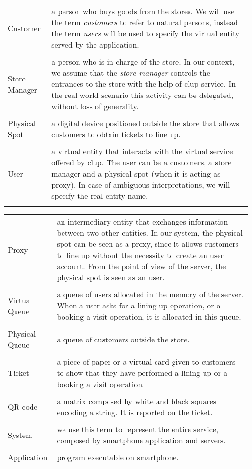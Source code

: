 \begin{tabularx}{\textwidth}{ >{\hsize=0.2\textwidth}X >{\hsize=0.8\textwidth}X}
  Customer & a person who buys goods from the stores. We will use the term \textit{customers} to refer to natural persons, instead the term \textit{users} will be used to specify the virtual entity served by the application.\\ \\
  Store Manager & a person who is in charge of the store. In our context, we assume that the \textit{store manager} controls the entrances to the store with the help of \gls{clup} service. In the real world scenario this activity can be delegated, without loss of generality.\\ \\
  Physical Spot & a digital device positioned outside the store that allows customers to obtain tickets to line up.\\ \\
  User & a virtual entity that interacts with the virtual service offered by \gls{clup}. The user can be a customers, a store manager and a physical spot (when it is acting as proxy). In case of ambiguous interpretations, we will specify the real entity name.\\ \\
\end{tabularx}
\begin{tabularx}{\textwidth}{ >{\hsize=0.2\textwidth}X >{\hsize=0.8\textwidth}X}
  Proxy & an intermediary entity that exchanges information between two other entities. In our system, the physical spot can be seen as a proxy, since it allows customers to line up without the necessity to create an user account. From the point of view of the server, the physical spot is seen as an user.\\ \\
  Virtual Queue & a queue of users allocated in the memory of the server. When a user asks for a lining up operation, or a booking a visit operation, it is allocated in this queue.\\ \\
  Physical Queue & a queue of customers outside the store.\\ \\
  Ticket & a piece of paper or a virtual card given to customers to show that they have performed a lining up or a booking a visit operation.\\ \\
  QR code & a matrix composed by white and black squares encoding a string. It is reported on the ticket.\\ \\
  System & we use this term to represent the entire service, composed by smartphone application and servers.\\ \\
  Application & program executable on smartphone.
\end{tabularx}

